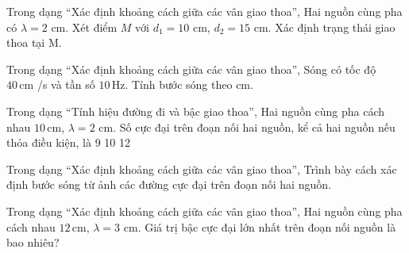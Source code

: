 \begin{ex}
Trong dạng “Xác định khoảng cách giữa các vân giao thoa”, Hai nguồn cùng pha có $\lambda=2$ cm. Xét điểm $M$ với $d_1=10$ cm, $d_2=15$ cm. Xác định trạng thái giao thoa tại M.
\choiceTF

\end{ex}

\begin{ex}
Trong dạng “Xác định khoảng cách giữa các vân giao thoa”, Sóng có tốc độ $40\,\text{cm}$ /s và tần số $10\,\text{Hz}$. Tính bước sóng theo cm.
\end{ex}

\begin{ex}
Trong dạng “Tính hiệu đường đi và bậc giao thoa”, Hai nguồn cùng pha cách nhau $10\,\text{cm}$, $\lambda=2$ cm. Số cực đại trên đoạn nối hai nguồn, kể cả hai nguồn nếu thỏa điều kiện, là
\choice
{9}
{10}
{}
{12}
\end{ex}

\begin{ex}
Trong dạng “Xác định khoảng cách giữa các vân giao thoa”, Trình bày cách xác định bước sóng từ ảnh các đường cực đại trên đoạn nối hai nguồn.
\choiceTF

\end{ex}

\begin{ex}
Trong dạng “Xác định khoảng cách giữa các vân giao thoa”, Hai nguồn cùng pha cách nhau $12\,\text{cm}$, $\lambda=3$ cm. Giá trị bậc cực đại lớn nhất trên đoạn nối nguồn là bao nhiêu?
\end{ex}

